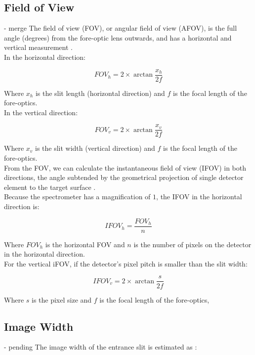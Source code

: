 \subsection{Field of View} - merge
The field of view (FOV), or angular field of view (AFOV), is the full angle (degrees) from the fore-optic lens outwards, and has a horizontal and vertical measurement \cite{Edmund_fov}.\\
In the horizontal direction:

\begin{equation}
    FOV_h = 2\times\arctan\frac{x_h}{2f}
\end{equation}

Where $x_h$ is the slit length (horizontal direction) and $f$ is the focal length of the fore-optics.\\
In the vertical direction:

\begin{equation}
    FOV_v = 2\times\arctan\frac{x_v}{2f}
\end{equation}

Where $x_v$ is the slit width (vertical direction) and $f$ is the focal length of the fore-optics.\\
From the FOV, we can calculate the instantaneous field of view (IFOV) in both directions, the angle subtended by the geometrical projection of single detector element to the target surface \cite{Specim}.\\
Because the spectrometer has a magnification of $1$, the IFOV in the horizontal direction is:

\begin{equation}
    IFOV_h = \frac{FOV_h}{n}
\end{equation}

Where $FOV_h$ is the horizontal FOV and $n$ is the number of pixels on the detector in the horizontal direction.\\
For the vertical iFOV, if the detector's pixel pitch is smaller than the slit width:

\begin{equation}
    IFOV_v = 2\times\arctan\frac{s}{2f}
\end{equation}

Where $s$ is the pixel size and $f$ is the focal length of the fore-optics,

\subsection{Image Width} - pending
The image width of the entrance slit is estimated as \cite{B&W_Tek}:

